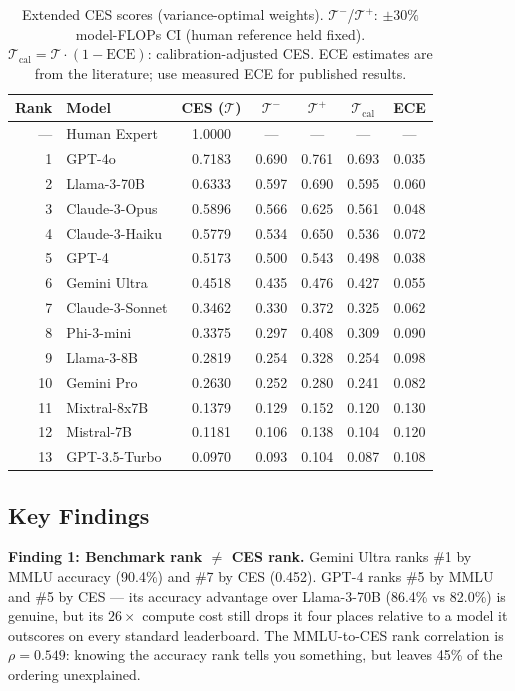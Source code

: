 \documentclass[12pt]{article}
\begin{document}
\begin{table}[H]
\centering
\small
\begin{tabular}{rlccccc}
\toprule
\textbf{Rank} & \textbf{Model} & \textbf{CES} ($\mathcal{T}$) & $\mathcal{T}^-$ & $\mathcal{T}^+$ & $\mathcal{T}_{\text{cal}}$ & \textbf{ECE} \\
\midrule
--- & Human Expert & 1.0000 & --- & --- & --- & --- \\
\midrule
1  & GPT-4o         & 0.7183 & 0.690 & 0.761 & 0.693 & 0.035 \\
2  & Llama-3-70B    & 0.6333 & 0.597 & 0.690 & 0.595 & 0.060 \\
3  & Claude-3-Opus  & 0.5896 & 0.566 & 0.625 & 0.561 & 0.048 \\
4  & Claude-3-Haiku & 0.5779 & 0.534 & 0.650 & 0.536 & 0.072 \\
5  & GPT-4          & 0.5173 & 0.500 & 0.543 & 0.498 & 0.038 \\
6  & Gemini Ultra   & 0.4518 & 0.435 & 0.476 & 0.427 & 0.055 \\
7  & Claude-3-Sonnet& 0.3462 & 0.330 & 0.372 & 0.325 & 0.062 \\
8  & Phi-3-mini     & 0.3375 & 0.297 & 0.408 & 0.309 & 0.090 \\
9  & Llama-3-8B     & 0.2819 & 0.254 & 0.328 & 0.254 & 0.098 \\
10 & Gemini Pro     & 0.2630 & 0.252 & 0.280 & 0.241 & 0.082 \\
11 & Mixtral-8x7B   & 0.1379 & 0.129 & 0.152 & 0.120 & 0.130 \\
12 & Mistral-7B     & 0.1181 & 0.106 & 0.138 & 0.104 & 0.120 \\
13 & GPT-3.5-Turbo  & 0.0970 & 0.093 & 0.104 & 0.087 & 0.108 \\
\bottomrule
\end{tabular}
\caption{Extended CES scores (variance-optimal weights). $\mathcal{T}^-$/$\mathcal{T}^+$: $\pm30\%$ model-FLOPs CI (human reference held fixed). $\mathcal{T}_{\text{cal}} = \mathcal{T} \cdot (1 - \mathrm{ECE})$: calibration-adjusted CES. ECE estimates are from the literature; use measured ECE for published results.}
\label{tab:ces-extended}
\end{table}

\subsection{Key Findings}

\textbf{Finding 1: Benchmark rank $\neq$ CES rank.} Gemini Ultra ranks \#1 by MMLU accuracy (90.4\%) and \#7 by CES (0.452). GPT-4 ranks \#5 by MMLU and \#5 by CES --- its accuracy advantage over Llama-3-70B (86.4\% vs 82.0\%) is genuine, but its $26\times$ compute cost still drops it four places relative to a model it outscores on every standard leaderboard. The MMLU-to-CES rank correlation is $\rho = 0.549$: knowing the accuracy rank tells you something, but leaves 45\% of the ordering unexplained.
\end{document}
